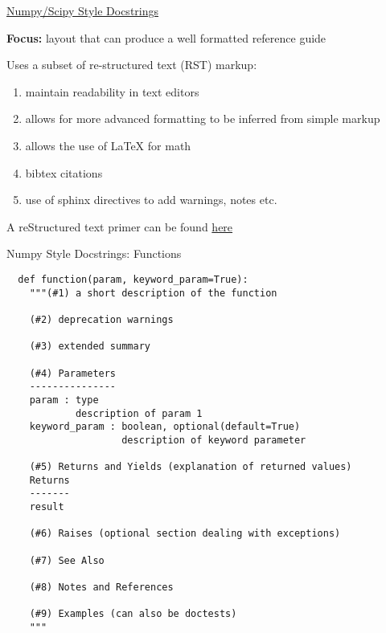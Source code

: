 \documentclass{beamer}
\begin{document}
\begin{frame}{\href{https://github.com/numpy/numpy/blob/master/doc/HOWTO_DOCUMENT.rst.txt\#docstring-standard}{Numpy/Scipy Style Docstrings}}  

\textbf{Focus:} layout that can produce a well formatted reference guide

Uses a subset of re-structured text (RST) markup:

\begin{enumerate}
  \item maintain readability in text editors
  \item allows for more advanced formatting to be inferred from simple markup
  \item allows the use of LaTeX for math
  \item bibtex citations
  \item use of sphinx directives to add warnings, notes etc.
\end{enumerate}

A reStructured text primer can be found \href{http://www.sphinx-doc.org/en/stable/rest.html}{here}

\end{frame}

\begin{frame}[fragile]{Numpy Style Docstrings: Functions}

\begin{verbatim}
  def function(param, keyword_param=True):
    """(#1) a short description of the function

    (#2) deprecation warnings

    (#3) extended summary

    (#4) Parameters
    ---------------
    param : type
            description of param 1
    keyword_param : boolean, optional(default=True)
                    description of keyword parameter
    
    (#5) Returns and Yields (explanation of returned values)
    Returns
    -------
    result

    (#6) Raises (optional section dealing with exceptions)

    (#7) See Also

    (#8) Notes and References

    (#9) Examples (can also be doctests)
    """
\end{verbatim}

\end{frame}
\end{document}
